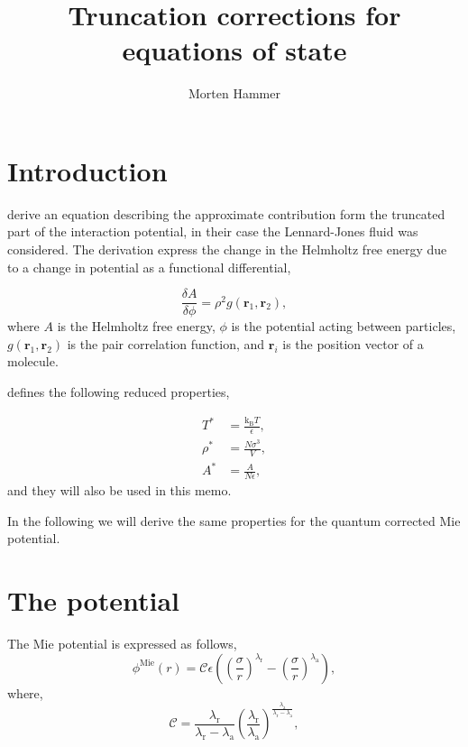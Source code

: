 \documentclass[english]{../thermomemo/thermomemo}
\title{Truncation corrections for equations of state}
\author{Morten Hammer}
\newcommand*{\vektor}[1]{\boldsymbol{#1}}%
\newcommand*{\lb}{\left(}
\newcommand*{\rb}{\right)}
\newcommand{\mie}{\text{Mie}\xspace}
\newcommand{\lama}{\ensuremath{{\lambda_{\text{a}}}}\xspace}
\newcommand{\lamr}{\ensuremath{{\lambda_{\text{r}}}}\xspace}
\newcommand{\KB}{\ensuremath{\text{k}_{\text{B}}}\xspace}
\begin{document}
\frontmatter
\tableofcontents
\section{Introduction}

\citet[Eq. 17]{Johnson1993} derive an equation describing the
approximate contribution form the truncated part of the interaction
potential, in their case the Lennard-Jones fluid was considered. The
derivation express the change in the Helmholtz free energy due to a
change in potential as a functional differential,

\begin{equation}
  \label{eq:dadphi}
  \frac{\delta A}{\delta \phi} = \rho^2 g \lb \vektor{r}_1,\vektor{r}_2 \rb,
\end{equation}
where $A$ is the Helmholtz free energy, $\phi$ is the potential acting
between particles, $g \lb \vektor{r}_1,\vektor{r}_2 \rb$ is the pair
correlation function, and $\vektor{r}_i$ is the position vector of a
molecule.

\citet[Eq. 17]{Johnson1993} defines the following reduced properties,

\begin{align}
  \label{eq:reduced}
  T^* &= \frac{\KB T}{\epsilon},\\
  \rho^* &= \frac{N \sigma^3}{V},\\
  A^* &= \frac{A}{N \epsilon},
\end{align}
and they will also be used in this memo.

In the following we will derive the same properties for the quantum corrected Mie potential.

\section{The potential}
The Mie potential is expressed as follows,
\begin{equation}
  \label{eq:Mie}
  \phi^\mie\lb r\rb = \mathcal{C}\epsilon \lb \lb\frac{\sigma}{r} \rb^\lamr - \lb\frac{\sigma}{r} \rb^\lama \rb,
\end{equation}
where,
\begin{equation}
  \label{eq:C}
  \mathcal{C} = \frac{\lamr}{\lamr - \lama}\lb\frac{\lamr}{\lama} \rb^{\frac{\lama}{\lamr - \lama}},
\end{equation}
\end{document}

